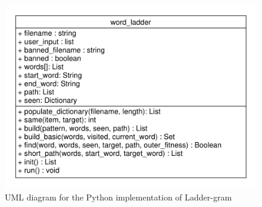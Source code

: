 \documentclass[12pt, a4]{report}
\begin{document}
	\begin{figure}[!h]
	\centering
	\includegraphics[scale=0.7]{UML}
	\caption{UML diagram for the Python implementation of Ladder-gram}
	\end{figure}
\end{document}

